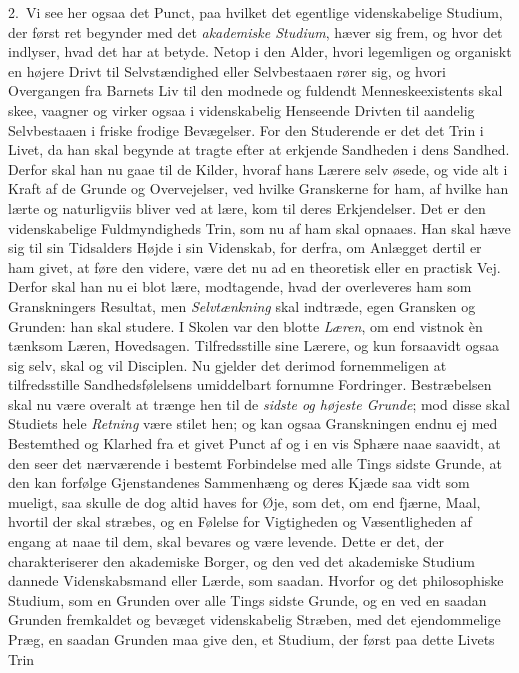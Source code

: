 \documentclass[12pt,a4paper]{book}
\newcommand{\apage}[1]{\marginnote{\footnotesize\textit{[#1]}}}
\begin{document}
2.~Vi see her ogsaa det Punct, paa hvilket det egentlige videnskabelige
Studium, der først ret begynder med det \emph{akademiske Studium}, hæver
sig frem, og hvor det indlyser, hvad det har at betyde. Netop i den Alder, hvori
legemligen og organiskt en højere Drivt til Selvstændighed eller Selvbestaaen
rører sig, og hvori Overgangen fra Barnets Liv til den modnede og fuldendt
Menneskeexistents skal skee, vaagner og virker  \apage{52} ogsaa i videnskabelig Henseende
Drivten til aandelig Selvbestaaen i friske frodige Bevægelser. For den Studerende
er det det Trin i Livet, da han skal begynde at tragte efter at erkjende
Sandheden i dens Sandhed. Derfor skal han nu gaae til de Kilder, hvoraf hans
Lærere selv øsede, og vide alt i Kraft af de Grunde og Overvejelser, ved hvilke
Granskerne for ham, af hvilke han lærte og naturligviis bliver ved at lære, kom
til deres Erkjendelser. Det er den videnskabelige Fuldmyndigheds Trin, som nu af
ham skal opnaaes. Han skal hæve sig til sin Tidsalders Højde i sin Videnskab, for
derfra, om Anlægget dertil er ham givet, at føre den videre, være det nu ad en
theoretisk eller en practisk Vej. Derfor skal han nu ei blot lære, modtagende,
hvad der overleveres ham som Granskningers Resultat, men \emph{Selvtænkning} skal
indtræde, egen Gransken og Grunden: han skal studere. I Skolen var den blotte
\emph{Læren}, om end vistnok èn tænksom Læren, Hovedsagen. Tilfredsstille sine
Lærere, og kun forsaavidt ogsaa sig selv, skal og vil Disciplen. Nu gjelder det
derimod fornemmeligen at tilfredsstille Sandhedsfølelsens umiddelbart fornumne
Fordringer. Bestræbelsen skal nu være overalt at trænge hen til de \emph{sidste
og højeste Grunde}; mod disse skal Studiets hele \emph{Retning} være stilet hen; og kan
ogsaa Granskningen endnu ej med Bestemthed og Klarhed fra et givet Punct af \apage{53} og
i en vis Sphære naae saavidt, at den seer det nærværende i bestemt Forbindelse
med alle Tings sidste Grunde, at den kan forfølge Gjenstandenes Sammenhæng og
deres Kjæde saa vidt som mueligt, saa skulle de dog altid haves for Øje, som
det, om end fjærne, Maal, hvortil der skal stræbes, og en Følelse for
Vigtigheden og Væsentligheden af engang at naae til dem, skal bevares og være
levende. Dette er det, der charakteriserer den akademiske Borger, og den ved det
akademiske Studium dannede Videnskabsmand eller Lærde, som saadan. Hvorfor og det
philosophiske Studium, som en Grunden over alle Tings sidste Grunde, og en ved en
saadan Grunden fremkaldet og bevæget videnskabelig Stræben, med det ejendommelige
Præg, en saadan Grunden maa give den, et Studium, der først paa dette Livets Trin
\end{document}
